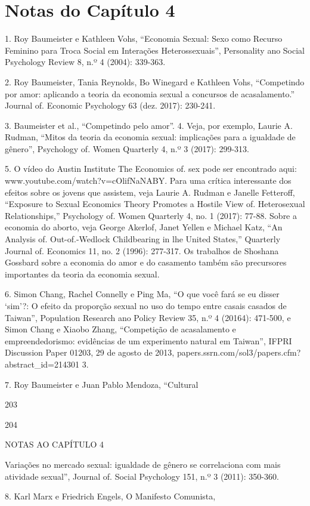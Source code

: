 \section{Notas do Capítulo 4}
 \par 
1. Roy Baumeister e Kathleen Vohs, “Economia Sexual: Sexo como Recurso Feminino para Troca Social em Interações Heterossexuais”, Personality ano Social Psychology Review 8, n.º {\color{blue}4} (2004): 339-363.
 \par 
2. Roy Baumeister, Tania Reynolds, Bo Winegard e Kathleen Vohs, “Competindo por amor: aplicando a teoria da economia sexual a concursos de acasalamento.” Journal of. Economic Psychology {\color{blue}63} (dez. 2017): 230-241.
 \par 
3. Baumeister et al., “Competindo pelo amor”. {\color{blue}4}. Veja, por exemplo, Laurie A. Rudman, “Mitos da teoria da economia sexual: implicações para a igualdade de gênero”, Psychology of. Women Quarterly 4, n.º {\color{blue}3} (2017): 299-313.
 \par 
5. O vídeo do Austin Institute The Economics of. sex pode ser encontrado aqui: www.youtube.com/watch?v=cOlifNaNABY. Para uma crítica interessante dos efeitos sobre os jovens que assistem, veja Laurie A. Rudman e Janelle Fetteroff, “Exposure to Sexual Economics Theory Promotes a Hostile View of. Heterosexual Relationships,” Psychology of. Women Quarterly 4, no. {\color{blue}1} (2017): 77-88. Sobre a economia do aborto, veja George Akerlof, Janet Yellen e Michael Katz, “An Analysis of. Out-of.-Wedlock Childbearing in lhe United States,” Quarterly Journal of. Economics 11, no. {\color{blue}2} (1996): 277-317. Os trabalhos de Shoshana Gossbard sobre a economia do amor e do casamento também são precursores importantes da teoria da economia sexual.
 \par 
6. Simon Chang, Rachel Connelly e Ping Ma, “O que você fará se eu disser ‘sim’?: O efeito da proporção sexual no uso do tempo entre casais casados ​​de Taiwan”, Population Research ano Policy Review 35, n.º {\color{blue}4} (20164): 471-500, e Simon Chang e Xiaobo Zhang, “Competição de acasalamento e empreendedorismo: evidências de um experimento natural em Taiwan”, IFPRI Discussion Paper 01203, {\color{blue}29} de agosto de 2013, papers.ssrn.com/sol3/papers.cfm?abstract_id=214301 {\color{blue}3}.
 \par 
7. Roy Baumeister e Juan Pablo Mendoza, “Cultural
 \par 
203
 \par 
204
 \par 
NOTAS AO CAPÍTULO {\color{blue}4}
 \par 
Variações no mercado sexual: igualdade de gênero se correlaciona com mais atividade sexual”, Journal of. Social Psychology 151, n.º {\color{blue}3} (2011): 350-360.
 \par 
8. Karl Marx e Friedrich Engels, O Manifesto Comunista,
 \par 
